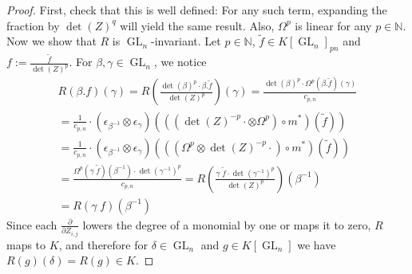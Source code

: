 \begin{proof}
  First, check that this is well defined:
  For any such term, expanding the fraction by $ \operatorname{det} (Z)^q $ will yield the same result.
  Also, $\Omega^p$ is linear for any $p \in \mathbb{N}$.
  Now we show that $R$ is $\operatorname{GL}_n$-invariant.
  Let $p \in \mathbb{N}$, $ \tilde{f} \in K \left\lbrack \operatorname{GL}_n \right\rbrack_{pn} $ and $ f := \frac{\tilde{f}}{\operatorname{det}(Z)^p} $.
  For $ \beta , \gamma \in \operatorname{GL}_n $, we notice
  \begin{equation}
    \begin{aligned}
      R \left( \beta . f \right) (\gamma)
      = R \left( \frac{ \operatorname{det} (\beta)^p \cdot \beta . \tilde{f}}{\operatorname{det} (Z)^p} \right) (\gamma)
      = \frac{ \operatorname{det} (\beta)^p \cdot \Omega^p \left( \beta . \tilde{f} \right) (\gamma) }{ c_{p,n} } \\
      = \frac{1}{c_{p,n}} \cdot \left( \epsilon_{\beta^{-1}} \otimes \epsilon_\gamma \right) \left( \left( \left( \operatorname{det}(Z)^{-p} \cdot \otimes \Omega^p \right) \circ m^\ast \right) \left( \tilde{f} \right) \right) \\
      = \frac{1}{c_{p,n}} \cdot \left( \epsilon_{\beta^{-1}} \otimes \epsilon_\gamma \right) \left( \left( \left( \Omega^p \otimes \operatorname{det}(Z)^{-p} \cdot \right) \circ m^\ast \right) \left( \tilde{f} \right) \right) \\
      = \frac{ \Omega^p \left( \gamma \dot{\phantom{.}} \tilde{f} \right) (\beta^{-1}) \cdot \operatorname{det} \left (\gamma^{-1} \right)^p }{ c_{p,n} }
      = R \left( \frac{ \gamma \dot{\phantom{.}} \tilde{f} \cdot \operatorname{det} \left( \gamma^{-1} \right)^p }{\operatorname{det} (Z)^p} \right) \left( \beta^{-1} \right) \\
      = R \left( \gamma \dot{\phantom{.}} f \right) \left( \beta^{-1} \right)
    \end{aligned}
  \end{equation}
  Since each $ \frac {\partial}{ \partial Z_{i,j} } $ lowers the degree of a monomial by one or maps it to zero, $R$ maps to $K$, and therefore for $ \delta \in \operatorname{GL}_n $ and $ g \in K \left\lbrack \operatorname{GL}_n \right\rbrack $ we have $ R(g)(\delta) = R(g) \in K $.

\end{proof}
